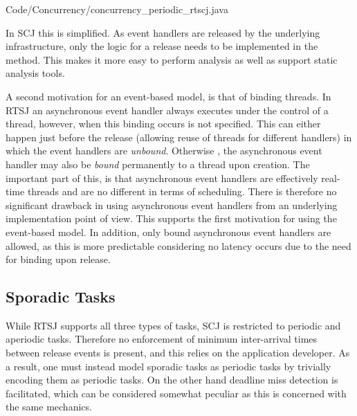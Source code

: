 
{Code/Concurrency/concurrency_periodic_rtscj.java}

In SCJ this is simplified. As event handlers are released by the underlying infrastructure, only the logic for a release needs to be implemented in the  method. This makes it more easy to perform analysis as well as support static analysis tools.

A second motivation for an event-based model, is that of binding threads. In RTSJ an asynchronous event handler always executes under the control of a thread, however, when this binding occurs is not specified. This can either happen just before the release (allowing reuse of threads for different handlers) in which the event handlers are \textit{unbound}. Otherwise , the asynchronous event handler may also be \textit{bound} permanently to a thread upon creation. The important part of this, is that asynchronous event handlers are effectively real-time threads and are no different in terms of scheduling. There is therefore no significant drawback in using asynchronous event handlers from an underlying implementation point of view. This supports the first motivation for using the event-based model. In addition, only bound asynchronous event handlers are allowed, as this is more predictable considering no latency occurs due to the need for binding upon release.

\subsection{Sporadic Tasks} %
\label{sub:support_for_sporadic_tasks}
While RTSJ supports all three types of tasks, SCJ is restricted to periodic and aperiodic tasks. Therefore no enforcement of minimum inter-arrival times between release events is present, and this relies on the application developer. As a result, one must instead model sporadic tasks as periodic tasks by trivially encoding them as periodic tasks. On the other hand deadline miss detection is facilitated, which can be considered somewhat peculiar as this is concerned with the same mechanics.

